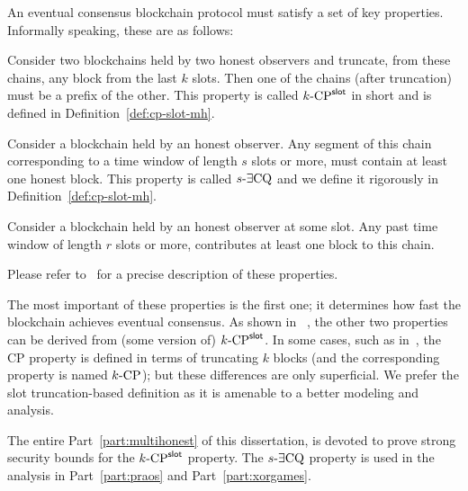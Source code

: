 An eventual consensus blockchain protocol 
must satisfy a set of key properties. Informally speaking, these are as follows:
\begin{description}[font=\normalfont\itshape\space]
  \item[Common Prefix Property (CP) with parameter $k$:]
  Consider two blockchains held by two honest observers and 
  truncate, from these chains, any block from the last $k$ slots. 
  Then one of the chains (after truncation) must be a prefix of the other. 
  This property is called ${k}\text{-}\mathrm{CP}^{\mathsf{slot}}$ in short and is defined in Definition~\ref{def:cp-slot-mh}. 

  \item[Chain Quality Property (CQ) with parameter $s$:]
  Consider a blockchain held by an honest observer. 
  Any segment of this chain 
  corresponding to a time window of length $s$ slots or more, 
  must contain at least one honest block.
  This property is called ${s}\text{-}\exists\mathrm{CQ}$ 
  and we define it rigorously in Definition~\ref{def:cp-slot-mh}. 

  \item[Chain Growth Property (CG) with parameter $r$:]
  Consider a blockchain held by an honest observer at some slot. 
  Any past time window of length $r$ slots or more, 
  contributes at least one block to this chain.
\end{description}
Please refer to~\cite{GKL,Ouroboros,Praos,Genesis,SnowWhite} for a precise description of these properties.


The most important of these properties is the first one; 
it determines how fast the blockchain achieves eventual consensus. 
As shown in ~\cite{Ouroboros}, 
the other two properties can be derived from (some version of) ${k}\text{-}\mathrm{CP}^{\mathsf{slot}}$.
In some cases, such as in~\cite{GKL,Ouroboros,SnowWhite}, 
the CP property is defined in terms of truncating $k$ blocks 
(and the corresponding property is named ${k}\text{-}\mathrm{CP}$); 
but these differences are only superficial. 
We prefer the slot truncation-based definition 
as it is amenable to a better modeling and analysis.


The entire Part~\ref{part:multihonest} of this dissertation, 
is devoted to prove strong security bounds for the ${k}\text{-}\mathrm{CP}^{\mathsf{slot}}$ property. 
The ${s}\text{-}\exists\mathrm{CQ}$ property is used in the analysis in 
Part~\ref{part:praos} and Part~\ref{part:xorgames}.



